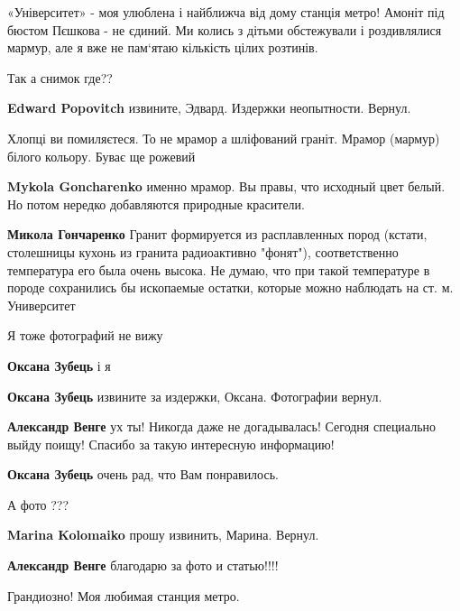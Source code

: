 \begin{itemize}
«Університет» - моя улюблена і найближча від дому станція метро! Амоніт під
бюстом Пєшкова - не єдиний. Ми колись з дітьми обстежували і роздивлялися
мармур, але я вже не пам‘ятаю кількість цілих розтинів.


Так а снимок где??

\textbf{Edward Popovitch} извините, Эдвард. Издержки неопытности. Вернул.


Хлопці ви помиляєтеся. То не мрамор а шліфований граніт. Мрамор (мармур) білого
кольору. Буває ще рожевий

\begin{itemize} %
\textbf{Mykola Goncharenko} именно мрамор. Вы правы, что исходный цвет белый. Но потом нередко добавляются природные красители.

\textbf{Микола Гончаренко} Гранит формируется из расплавленных пород (кстати, столешницы кухонь из гранита радиоактивно "фонят"), соответственно температура его была очень высока. Не думаю, что при такой температуре в породе сохранились бы ископаемые остатки, которые можно наблюдать на ст. м. Университет
\end{itemize} %

Я тоже фотографий не вижу

\begin{itemize} %
\textbf{Оксана Зубець} і я

\textbf{Оксана Зубець} извините за издержки, Оксана. Фотографии вернул.

\textbf{Александр Венге} ух ты! Никогда даже не догадывалась! Сегодня специально выйду поищу! Спасибо за такую интересную информацию!

\textbf{Оксана Зубець} очень рад, что Вам понравилось.
\end{itemize} %

А фото ???

\begin{itemize} %
\textbf{Marina Kolomaiko} прошу извинить, Марина. Вернул.

\textbf{Александр Венге} благодарю за фото и статью!!!!
\end{itemize} %

Грандиозно! Моя любимая станция метро.


\end{itemize}
